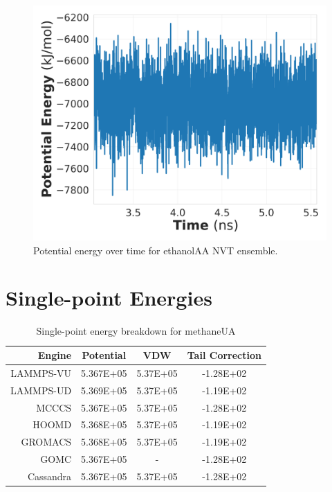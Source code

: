 \begin{figure}[h!]
    \centering
    \includegraphics[width=0.8\linewidth,keepaspectratio]{figures/rep_study/ethanol_pe.png}
    \caption{Potential energy over time for ethanolAA NVT ensemble.}\label{fig:ethanol_pe_evolution}
\end{figure}

\section{Single-point Energies}

\begin{table}[h!]
\caption{Single-point energy breakdown for methaneUA}\label{tab:sp_methane}
\centering
\begin{tabular}{rccc}
Engine & Potential & VDW & Tail Correction \\ \hline
LAMMPS-VU & 5.367E+05 & 5.37E+05 & -1.28E+02 \\
LAMMPS-UD & 5.369E+05 & 5.37E+05 & -1.19E+02 \\
MCCCS & 5.367E+05 & 5.37E+05 & -1.28E+02 \\
HOOMD & 5.368E+05 & 5.37E+05 & -1.19E+02 \\
GROMACS & 5.368E+05 & 5.37E+05 & -1.19E+02 \\
GOMC & 5.367E+05 & - & -1.28E+02 \\
Cassandra & 5.367E+05 & 5.37E+05 & -1.28E+02 \\ \hline
\end{tabular}
\end{table}

